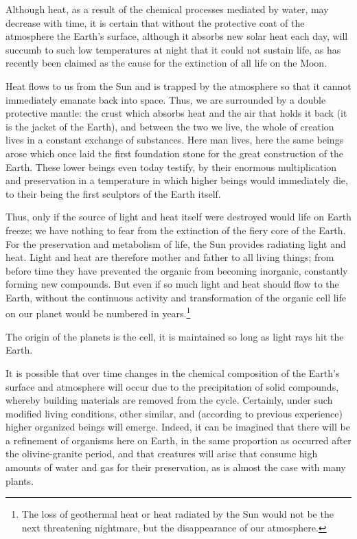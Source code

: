 \documentclass[a4paper, 11pt, oneside]{article}
\begin{document}
Although heat, as a result of the chemical processes mediated by water, may decrease with time, it is certain that without the protective coat of the atmosphere the Earth's surface, although it absorbs new solar heat each day, will succumb to such low temperatures at night that it could not sustain life, as has recently been claimed as the cause for the extinction of all life on the Moon.

Heat flows to us from the Sun and is trapped by the atmosphere so that it cannot immediately emanate back into space. Thus, we are surrounded by a double protective mantle: the crust which absorbs heat and the air that holds it back (it is the jacket of the Earth), and between the two we live, the whole of creation lives in a constant exchange of substances. Here man lives, here the same beings arose which once laid the first foundation stone for the great construction of the Earth. These lower beings even today testify, by their enormous multiplication and preservation in a temperature in which higher beings would immediately die, to their being the first sculptors of the Earth itself.

Thus, only if the source of light and heat itself were destroyed would life on Earth freeze; we have nothing to fear from the extinction of the fiery core of the Earth. For the preservation and metabolism of life, the Sun provides radiating light and heat. Light and heat are therefore mother and father to all living things; from before time they have prevented the organic from becoming inorganic, constantly forming new compounds. But even if so much light and heat should flow to the Earth, without the continuous activity and transformation of the organic cell life on our planet would be numbered in years.\footnote{The loss of geothermal heat or heat radiated by the Sun would not be the next threatening nightmare, but the disappearance of our atmosphere.}

The origin of the planets is the cell, it is maintained so long as light rays hit the Earth.

It is possible that over time changes in the chemical composition of the Earth's surface and atmosphere will occur due to the precipitation of solid compounds, whereby building materials are removed from the cycle. Certainly, under such modified living conditions, other similar, and (according to previous experience) higher organized beings will emerge. Indeed, it can be imagined that there will be a refinement of organisms here on Earth, in the same proportion as occurred after the olivine-granite period, and that creatures will arise that consume high amounts of water and gas for their preservation, as is almost the case with many plants.
\clearpage
\end{document}
